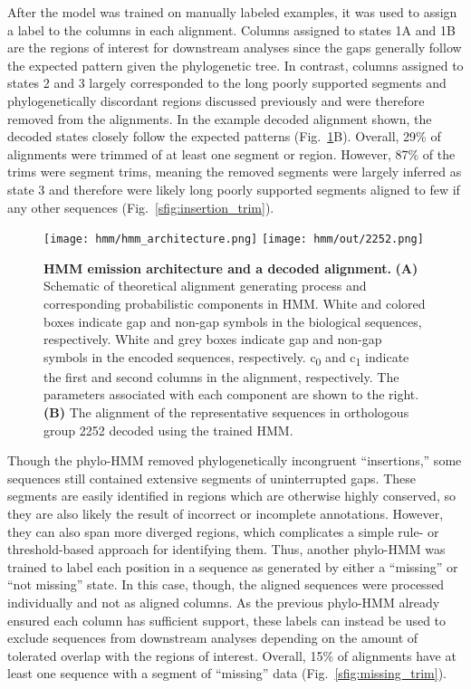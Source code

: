 After the model was trained on manually labeled examples, it was used to assign a label to the columns in each alignment. Columns assigned to states 1A and 1B are the regions of interest for downstream analyses since the gaps generally follow the expected pattern given the phylogenetic tree. In contrast, columns assigned to states 2 and 3 largely corresponded to the long poorly supported segments and phylogenetically discordant regions discussed previously and were therefore removed from the alignments. In the example decoded alignment shown, the decoded states closely follow the expected patterns (Fig.~\ref{fig:hmm}B). Overall, 29\% of alignments were trimmed of at least one segment or region. However, 87\% of the trims were segment trims, meaning the removed segments were largely inferred as state 3 and therefore were likely long poorly supported segments aligned to few if any other sequences (Fig.~\ref{sfig:insertion_trim}).

\begin{figure}[h!]
\texttt{[image: hmm/hmm\_architecture.png]}
\texttt{[image: hmm/out/2252.png]}
\centering
\caption{\textbf{HMM emission architecture and a decoded alignment.}
\textbf{(A)} Schematic of theoretical alignment generating process and corresponding probabilistic components in HMM. White and colored boxes indicate gap and non-gap symbols in the biological sequences, respectively. White and grey boxes indicate gap and non-gap symbols in the encoded sequences, respectively. c\textsubscript{0} and c\textsubscript{1} indicate the first and second columns in the alignment, respectively. The parameters associated with each component are shown to the right. \textbf{(B)} The alignment of the representative sequences in orthologous group 2252 decoded using the trained HMM.}
\label{fig:hmm}
\end{figure}

Though the phylo-HMM removed phylogenetically incongruent ``insertions,'' some sequences still contained extensive segments of uninterrupted gaps. These segments are easily identified in regions which are otherwise highly conserved, so they are also likely the result of incorrect or incomplete annotations. However, they can also span more diverged regions, which complicates a simple rule- or threshold-based approach for identifying them. Thus, another phylo-HMM was trained to label each position in a sequence as generated by either a ``missing'' or ``not missing'' state. In this case, though, the aligned sequences were processed individually and not as aligned columns. As the previous phylo-HMM already ensured each column has sufficient support, these labels can instead be used to exclude sequences from downstream analyses depending on the amount of tolerated overlap with the regions of interest. Overall, 15\% of alignments have at least one sequence with a segment of ``missing'' data (Fig.~\ref{sfig:missing_trim}).

